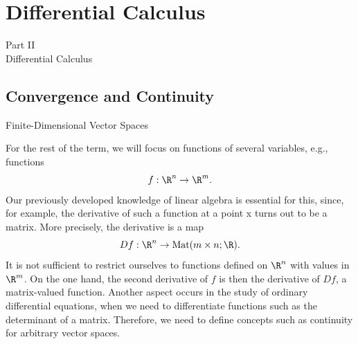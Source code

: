 \documentclass[smaller,hyperref={CJKbookmarks=true}]{beamer}
\begin{document}
\section{Dif{}ferential Calculus}
\begin{frame}[c]
\begin{center}
  \Huge{Part II}\\ \alert{Dif{}ferential Calculus}
\end{center}
\end{frame}
\begin{frame}[c] \begin{spacing}{2.5}
\tableofcontents[hideothersubsections,sectionstyle=hide] \end{spacing}
\end{frame}
\subsection{Convergence and Continuity}
\begin{frame}[c]
\begin{spacing}{2.5}
\tableofcontents[sectionstyle=hide,subsectionstyle=show/shaded/hide]
\end{spacing}
\end{frame}
\begin{frame}[t,shrink]{Finite-Dimensional Vector Spaces}
\begin{spacing}{1}
For the rest of the term, we will focus on functions of several variables, e.g., functions
\[f:\R^n\to\R^m.\]
Our previously developed knowledge of linear algebra is essential for this,
since, for example, the derivative of such a function at a point x turns out
to be a matrix. More precisely, the derivative is a map
\[Df:\R^n\to\text{Mat}(m\times n;\R).\]
It is not suf{}ficient to restrict ourselves to functions defined on $\R^n$ with
values in $\R^m$. On the one hand, the second derivative of $f$ is then the
derivative of $Df$, a matrix-valued function. Another aspect occurs in the
study of ordinary dif{}ferential equations, when we need to dif{}ferentiate
functions such as the determinant of a matrix. Therefore, we need to
define concepts such as continuity for arbitrary vector spaces.
\end{spacing}
\end{frame}
\end{document}
